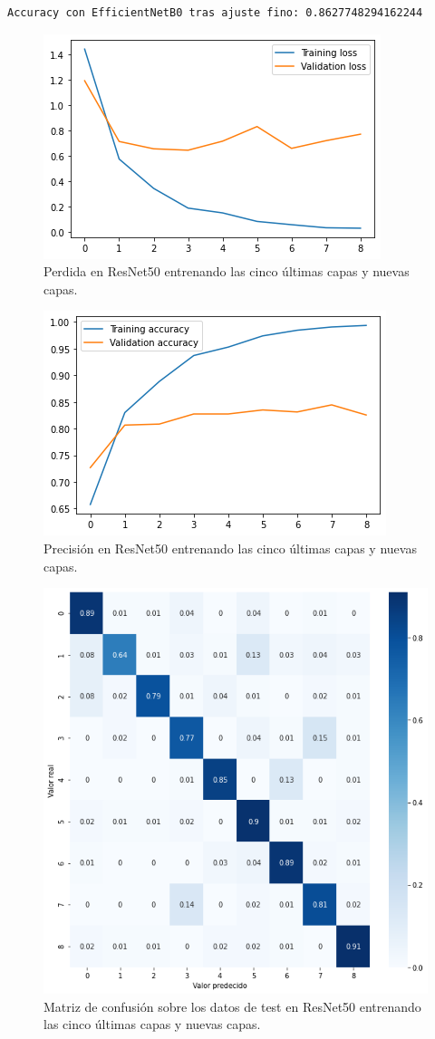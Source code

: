 \begin{lstlisting}
Accuracy con EfficientNetB0 tras ajuste fino: 0.8627748294162244
\end{lstlisting}















\begin{figure}[H]
  \centering
  \includegraphics[width=0.5\linewidth]{Imagenes/entrenamiento_redes/5-ult/resnet_5ult_loss.png}
  \caption{Perdida en ResNet50 entrenando las cinco últimas capas y nuevas capas.}
\end{figure}

\begin{figure}[H]
  \centering
  \includegraphics[width=0.5\linewidth]{Imagenes/entrenamiento_redes/5-ult/resnet_5ult_acc.png}
  \caption{Precisión en ResNet50 entrenando las cinco últimas capas y nuevas capas.}
\end{figure}

\begin{figure}[H]
  \centering
  \includegraphics[width=0.5\linewidth]{Imagenes/entrenamiento_redes/5-ult/resnet_5ult_matriz.png}
  \caption{Matriz de confusión sobre los datos de test en ResNet50 entrenando las cinco últimas capas y nuevas capas.}
\end{figure}

